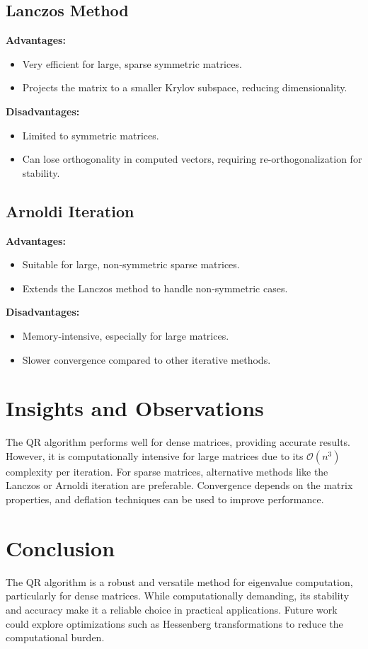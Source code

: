 \documentclass[12pt]{article}
\begin{document}
\subsection{Lanczos Method}
\textbf{Advantages:}
\begin{itemize}
    \item Very efficient for large, sparse symmetric matrices.
    \item Projects the matrix to a smaller Krylov subspace, reducing dimensionality.
\end{itemize}
\textbf{Disadvantages:}
\begin{itemize}
    \item Limited to symmetric matrices.
    \item Can lose orthogonality in computed vectors, requiring re-orthogonalization for stability.
\end{itemize}

\subsection{Arnoldi Iteration}
\textbf{Advantages:}
\begin{itemize}
    \item Suitable for large, non-symmetric sparse matrices.
    \item Extends the Lanczos method to handle non-symmetric cases.
\end{itemize}
\textbf{Disadvantages:}
\begin{itemize}
    \item Memory-intensive, especially for large matrices.
    \item Slower convergence compared to other iterative methods.
\end{itemize}



\section{Insights and Observations}
The QR algorithm performs well for dense matrices, providing accurate results. However, it is computationally intensive for large matrices due to its $\mathcal{O}(n^3)$ complexity per iteration. For sparse matrices, alternative methods like the Lanczos or Arnoldi iteration are preferable. Convergence depends on the matrix properties, and deflation techniques can be used to improve performance.

\section{Conclusion}
The QR algorithm is a robust and versatile method for eigenvalue computation, particularly for dense matrices. While computationally demanding, its stability and accuracy make it a reliable choice in practical applications. Future work could explore optimizations such as Hessenberg transformations to reduce the computational burden.
\end{document}
